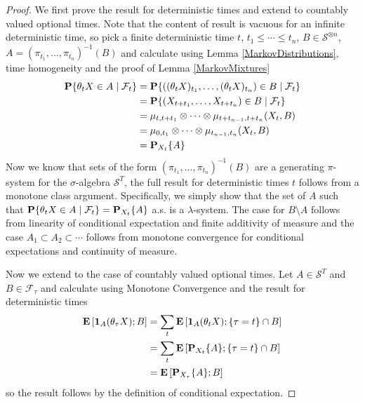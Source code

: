\begin{proof}
We first prove the result for deterministic times and extend to
countably valued optional times.  Note that the content of result is
vacuous for an infinite deterministic time, so pick a finite
deterministic time $t$, $t_1
\leq \cdots \leq t_n$, $B \in \mathcal{S}^{\otimes n}$, $A =
(\pi_{t_1}, \dotsc, \pi_{t_n})^{-1}(B)$ and
calculate using Lemma \ref{MarkovDistributions}, time homogeneity and
the proof of Lemma \ref{MarkovMixtures}
\begin{align*}
\cprobability{\mathcal{F}_t}{\theta_t X \in A} &=
\cprobability{\mathcal{F}_t}{((\theta_t X)_{t_1}, \dotsc,
  (\theta_t X)_{t_n}) \in B} \\
&= \cprobability{\mathcal{F}_t}{(X_{t
    + t_1}, \dotsc, X_{t+ t_n}) \in B} \\
&= \mu_{t, t + t_1} \otimes \cdots \otimes \mu_{t+t_{n-1}, t+t_n}(X_t,
B) \\
&=\mu_{0, t_1} \otimes \cdots \otimes \mu_{t_{n-1}, t_n}(X_t, B) \\
&= \sprobability {A}{X_t}
\end{align*}
Now we know that sets of the form 
$(\pi_{t_1}, \dotsc, \pi_{t_n})^{-1}(B)$ are a
generating $\pi$-system for the $\sigma$-algebra $\mathcal{S}^T$,
the full result for deterministic times $t$ follows from a monotone
class argument.  Specifically, we simply show that the set of $A$ such that
$\cprobability{\mathcal{F}_t}{\theta_t X \in A} =
\sprobability{A}{X_t}$ a.s. is a $\lambda$-system.  The case for $B
\setminus A$ follows from linearity of conditional expectation and
finite additivity of measure and the case $A_1 \subset A_2 \subset
\cdots$ follows from monotone convergence for conditional expectations
and continuity of measure.

Now we extend to the case of countably valued optional times.  Let $A
\in \mathcal{S}^T$ and $B \in \mathcal{F}_\tau$ and calculate using
Monotone Convergence and the result for deterministic times
\begin{align*}
\expectation{\characteristic{A}(\theta_\tau X) ; B} &= \sum_t
\expectation{\characteristic{A}(\theta_t X) ; \lbrace \tau = t \rbrace
  \cap B} \\
&= \sum_t \expectation{\sprobability{A}{X_t} ; \lbrace \tau = t \rbrace
  \cap B} \\
&= \expectation{\sprobability{A}{X_\tau} ; B} 
\end{align*}
so the result follows by the definition of conditional expectation. 


\end{proof}
